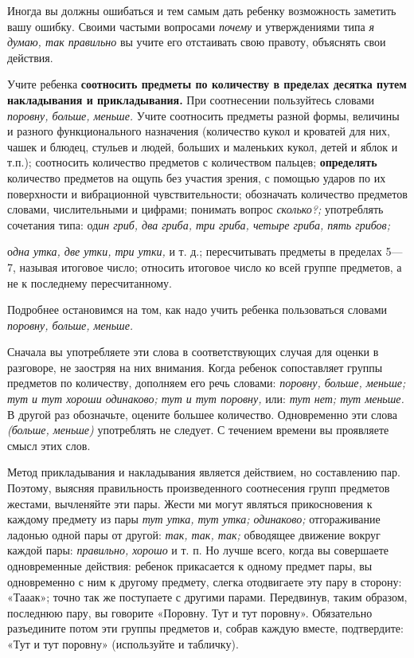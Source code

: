 \documentclass{book}
\renewcommand{\emph}[1]{\textit{#1}}
\begin{document}
Иногда вы должны ошибаться и тем самым дать ребенку возможность заметить
вашу ошибку. Своими частыми вопросами \emph{почему} и утверждениями типа
\emph{я думаю, так правильно} вы учите его отстаивать свою правоту,
объяснять свои действия.

Учите ребенка \textbf{соотносить предметы по количеству в пределах
десятка путем накладывания и прикладывания.} При соотнесении пользуйтесь
словами \emph{поровну, больше, меньше.} Учите соотносить предметы разной
формы, величины и разного функционального назначения (количество кукол и
кроватей для них, чашек и блюдец, стульев и людей, больших и маленьких
кукол, детей и яблок и т.п.); соотносить количество предметов с
количеством пальцев; \textbf{определять} количество предметов на ощупь
без участия зрения, с помощью ударов по их поверхности и вибрационной
чувствительности; обозначать количество предметов словами, числительными
и цифрами; понимать вопрос \emph{сколько?;} употреблять сочетания типа:
од\emph{ин гриб, два гриба, три гриба, четыре гриба, пять грибов;}

о\emph{дна утка, две утки, три утки,} и т. д.; пересчитывать предметы в
пределах 5---7, называя итоговое число; относить итоговое число ко всей
группе предметов, а не к последнему пересчитанному.

Подробнее остановимся на том, как надо учить ребенка пользоваться
словами \emph{поровну, больше, меньше.}

Сначала вы употребляете эти слова в соответствующих случая для оценки в
разговоре, не заостряя на них внимания. Когда ребенок сопоставляет
группы предметов по количеству, дополняем его речь словами:
\emph{поровну, больше, меньше; тут и тут хороши одинаково; тут и тут
поровну,} или: \emph{тут нет; тут меньше.} В другой раз обозначьте,
оцените большее количество. Одновременно эти слова \emph{(больше,
меньше)} употреблять не следует. С течением времени вы проявляете смысл
этих слов.

Метод прикладывания и накладывания является действием, но составлению
пар. Поэтому, выясняя правильность произведенного соотнесения групп
предметов жестами, вычленяйте эти пары. Жести ми могут являться
прикосновения к каждому предмету из пары \emph{тут утка, тут утка;
одинаково;} отгораживание ладонью одной пары от другой: \emph{так, так,
так;} обводящее движение вокруг каждой пары: \emph{правильно, хорошо} и
т. п. Но лучше всего, когда вы совершаете одновременные действия:
ребенок прикасается к одному предмет пары, вы одновременно с ним к
другому предмету, слегка отодвигаете эту пару в сторону: «Тааак»; точно
так же поступаете с другими парами. Передвинув, таким образом, последнюю
пару, вы говорите «Поровну. Тут и тут поровну». Обязательно разъедините
потом эти группы предметов и, собрав каждую вместе, подтвердите: «Тут и
тут поровну» (используйте и табличку).
\end{document}
